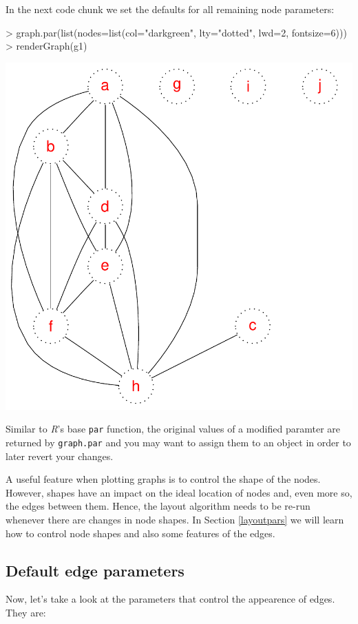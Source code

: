 \documentclass{article}
\newcommand{\Rfunction}[1]{{\texttt{#1}}}
\newcommand{\R}[0]{{\textit{R}}}
\begin{document}
In the next code chunk we set the defaults for all remaining node parameters:
\begin{Schunk}
\begin{Sinput}
> graph.par(list(nodes=list(col="darkgreen", lty="dotted", lwd=2, fontsize=6)))
> renderGraph(g1)
\end{Sinput}
\end{Schunk}
\includegraphics{newRgraphvizInterface-nodepardefs}

Similar to \R{}'s base \Rfunction{par} function, the original values
of a modified paramter are returned by \Rfunction{graph.par} and you
may want to assign them to an object in order to later revert your
changes.

A useful feature when plotting graphs is to control the shape of the
nodes. However, shapes have an impact on the ideal location of nodes
and, even more so, the edges between them. Hence, the layout algorithm
needs to be re-run whenever there are changes in node shapes. In
Section \ref{layoutpars} we will learn how to control node shapes and
also some features of the edges.

\subsection{Default edge parameters}
Now, let's take a look at the parameters that control the appearence
of edges. They are:
\end{document}
